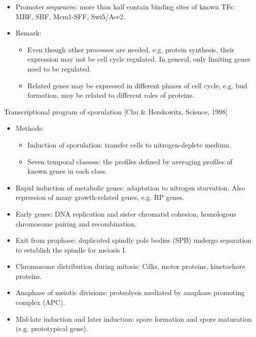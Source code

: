 \documentclass{report}
\begin{document}
\begin{itemize}
	\item Promoter sequences: more than half contain binding sites of known TFs: MBF, SBF, Mcm1-SFF, Swi5/Ace2. 
	
	\item Remark: 
	\begin{itemize}
		\item Even though other processes are needed, e.g. protein synthesis, their expression may not be cell cycle regulated. In general, only limiting genes need to be regulated. 
		\item Related genes may be expressed in different phases of cell cycle, e.g. bud formation, may be related to different roles of proteins. 
	\end{itemize} 
\end{itemize}

Transcriptional program of sporulation [Chu \& Herskowitz, Science, 1998]
\begin{itemize}
	\item Methods: 
	\begin{itemize}
		\item Induction of sporulation: transfer cells to nitrogen-deplete medium.
		\item Seven temporal classess: the profiles defined by averaging profiles of known genes in each class. 
	\end{itemize}
	
	\item Rapid induction of metabolic genes: adaptation to nitrogen starvation. Also repression of many growth-related genes, e.g. RP genes. 
	\item Early genes: DNA replication and sister chromatid cohesion, homologous chromosome pairing and recombination. 
	\item Exit from prophase: duplicated spindly pole bodies (SPB) undergo separation to establish the spindle for meiosis I. 
	\item Chromosome distribution during mitosis: Cdks, motor proteins, kinetochore proteins. 
	\item Anaphase of meiotic divisions: proteolysis mediated by anaphase promoting complex (APC). 
	\item Mid-late induction and later induction: spore formation and spore maturation (e.g. prototypical gene). 
\end{itemize}
\end{document}
